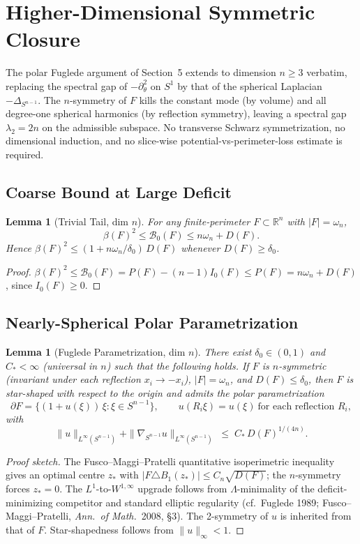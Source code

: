 \documentclass[11pt]{article}
\newtheorem{lemma}[theorem]{Lemma}
\newcommand{\R}{\mathbb{R}}
\newcommand{\B}{\mathcal{B}}
\begin{document}
\section{Higher-Dimensional Symmetric Closure}

The polar Fuglede argument of Section~5 extends to dimension $n \ge 3$ verbatim, replacing the spectral gap of $-\partial_\theta^2$ on $S^1$ by that of the spherical Laplacian $-\Delta_{S^{n-1}}$. The $n$-symmetry of $F$ kills the constant mode (by volume) and all degree-one spherical harmonics (by reflection symmetry), leaving a spectral gap $\lambda_2 = 2n$ on the admissible subspace. No transverse Schwarz symmetrization, no dimensional induction, and no slice-wise potential-vs-perimeter-loss estimate is required.

\subsection{Coarse Bound at Large Deficit}
\begin{lemma}[Trivial Tail, dim $n$] \label{lem:CoarseN}
For any finite-perimeter $F\subset\R^n$ with $|F|=\omega_n$,
\[ \beta(F)^2 \le \B_0(F) \le n\omega_n + D(F). \]
Hence $\beta(F)^2 \le (1 + n\omega_n/\delta_0)\,D(F)$ whenever $D(F)\ge\delta_0$.
\end{lemma}
\begin{proof}
$\beta(F)^2 \le \B_0(F) = P(F) - (n-1)I_0(F) \le P(F) = n\omega_n + D(F)$, since $I_0(F)\ge 0$.
\end{proof}

\subsection{Nearly-Spherical Polar Parametrization}
\begin{lemma}[Fuglede Parametrization, dim $n$] \label{lem:NS_n}
There exist $\delta_0\in(0,1)$ and $C_*<\infty$ (universal in $n$) such that the following holds. If $F$ is $n$-symmetric (invariant under each reflection $x_i\to -x_i$), $|F|=\omega_n$, and $D(F)\le\delta_0$, then $F$ is star-shaped with respect to the origin and admits the polar parametrization
\[
   \partial F = \bigl\{(1+u(\xi))\,\xi : \xi \in S^{n-1}\bigr\}, \qquad u(R_i\xi) = u(\xi)\ \text{for each reflection } R_i,
\]
with
\[
   \|u\|_{L^\infty(S^{n-1})} + \|\nabla_{S^{n-1}} u\|_{L^\infty(S^{n-1})} \;\le\; C_*\,D(F)^{1/(4n)}.
\]
\end{lemma}
\begin{proof}[Proof sketch]
The Fusco--Maggi--Pratelli quantitative isoperimetric inequality gives an optimal centre $z_*$ with $|F\triangle B_1(z_*)| \le C_n\sqrt{D(F)}$; the $n$-symmetry forces $z_*=0$. The $L^1$-to-$W^{1,\infty}$ upgrade follows from $\Lambda$-minimality of the deficit-minimizing competitor and standard elliptic regularity (cf.\ Fuglede 1989; Fusco--Maggi--Pratelli, \emph{Ann.\ of Math.}\ 2008, §3). The 2-symmetry of $u$ is inherited from that of $F$. Star-shapedness follows from $\|u\|_\infty < 1$.
\end{proof}
\end{document}
